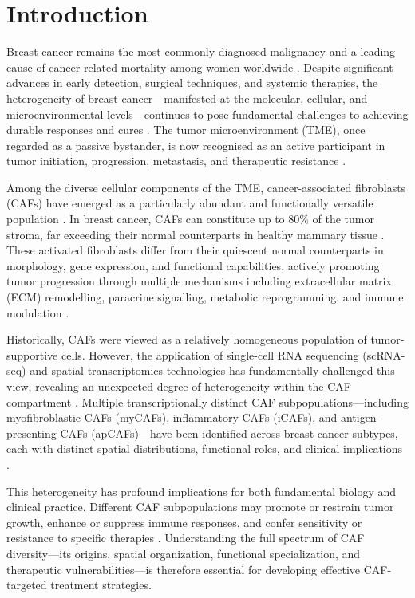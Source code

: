 \section{Introduction}
\label{sec:intro}

Breast cancer remains the most commonly diagnosed malignancy and a leading cause of cancer-related mortality among women worldwide \citep{sung2021global}. Despite significant advances in early detection, surgical techniques, and systemic therapies, the heterogeneity of breast cancer---manifested at the molecular, cellular, and microenvironmental levels---continues to pose fundamental challenges to achieving durable responses and cures \citep{perou2000molecular}. The tumor microenvironment (TME), once regarded as a passive bystander, is now recognised as an active participant in tumor initiation, progression, metastasis, and therapeutic resistance \citep{hanahan2011hallmarks}.

Among the diverse cellular components of the TME, cancer-associated fibroblasts (CAFs) have emerged as a particularly abundant and functionally versatile population \citep{kalluri2016biology}. In breast cancer, CAFs can constitute up to 80\% of the tumor stroma, far exceeding their normal counterparts in healthy mammary tissue \citep{orimo2005stromal}. These activated fibroblasts differ from their quiescent normal counterparts in morphology, gene expression, and functional capabilities, actively promoting tumor progression through multiple mechanisms including extracellular matrix (ECM) remodelling, paracrine signalling, metabolic reprogramming, and immune modulation \citep{sahai2020framework}.

Historically, CAFs were viewed as a relatively homogeneous population of tumor-supportive cells. However, the application of single-cell RNA sequencing (scRNA-seq) and spatial transcriptomics technologies has fundamentally challenged this view, revealing an unexpected degree of heterogeneity within the CAF compartment \citep{bartoschek2018spatially, lambrechts2018phenotype}. Multiple transcriptionally distinct CAF subpopulations---including myofibroblastic CAFs (myCAFs), inflammatory CAFs (iCAFs), and antigen-presenting CAFs (apCAFs)---have been identified across breast cancer subtypes, each with distinct spatial distributions, functional roles, and clinical implications \citep{erve2024}.

This heterogeneity has profound implications for both fundamental biology and clinical practice. Different CAF subpopulations may promote or restrain tumor growth, enhance or suppress immune responses, and confer sensitivity or resistance to specific therapies \citep{chhabra2023}. Understanding the full spectrum of CAF diversity---its origins, spatial organization, functional specialization, and therapeutic vulnerabilities---is therefore essential for developing effective CAF-targeted treatment strategies.

